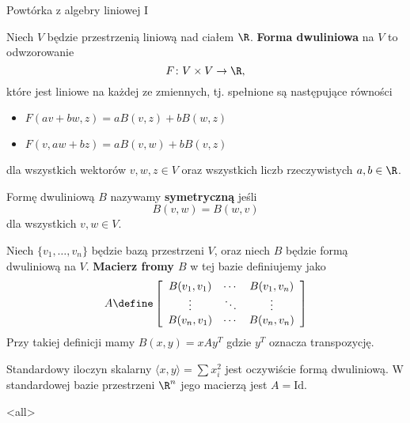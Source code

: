 \begin{frame}{Powtórka z algebry liniowej I}

\begin{definicja}
Niech $V$ będzie przestrzenią liniową nad ciałem $\R$. \textbf{Forma dwuliniowa} na $V$ to odwzorowanie 
\[F\colon V\times V\to \R,\]
które jest liniowe na każdej ze zmiennych, tj. spełnione są następujące równości
\pause\begin{itemize}
\item $F(av+bw,z)=aB(v,z)+bB(w,z)$
\item $F(v,aw+bz)=aB(v,w)+bB(v,z)$
\end{itemize}
dla wszystkich wektorów $v,w,z\in V$ oraz wszystkich liczb rzeczywistych $a,b\in \R$.
\end{definicja}

\end{frame}
\begin{frame}[<+->]


\begin{definicja}
Formę dwuliniową $B$ nazywamy \textbf{symetryczną} jeśli \[B(v,w)=B(w,v)\] dla wszystkich $v,w\in V$.
\end{definicja}

\begin{definicja}
Niech $\{v_1,\ldots,v_n\}$ będzie bazą przestrzeni $V$, oraz  niech $B$ będzie formą dwuliniową na $V$. \textbf{Macierz fromy $B$} w tej bazie definiujemy jako \[A\define\left[
\begin{array}{ccc}
B(v_1,v_1) & \cdots & B(v_1,v_n)\\
\vdots & \ddots & \vdots\\
B(v_n,v_1) & \cdots & B(v_n,v_n)
\end{array}
\right]\]
Przy takiej definicji mamy $B(x,y)=xAy^T$ gdzie $y^T$ oznacza transpozycję.
\end{definicja}
\end{frame}
\begin{frame}[<+->]

\begin{przyklad}
Standardowy iloczyn skalarny $\langle x,y\rangle=\sum x_i^2$ jest oczywiście formą dwuliniową. W standardowej bazie przestrzeni $\R^n$ jego macierzą jest $A=\text{Id}$. 
\end{przyklad}

\end{frame}
\mode<all>{}

